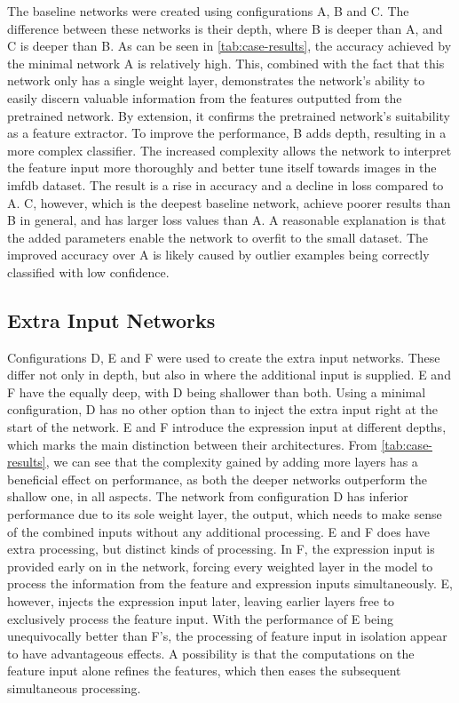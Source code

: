 The baseline networks were created using configurations A, B and C. The difference between these networks is their depth, where B is deeper than A, and C is deeper than B. As can be seen in \autoref{tab:case-results}, the accuracy achieved by the minimal network A is relatively high. This, combined with the fact that this network only has a single weight layer, demonstrates the network's ability to easily discern valuable information from the features outputted from the pretrained network. By extension, it confirms the pretrained network's suitability as a feature extractor. To improve the performance, B adds depth, resulting in a more complex classifier. The increased complexity allows the network to interpret the feature input more thoroughly and better tune itself towards images in the \acrshort{imfdb} dataset. The result is a rise in accuracy and a decline in loss compared to A. C, however, which is the deepest baseline network, achieve poorer results than B in general, and has larger loss values than A. A reasonable explanation is that the added parameters enable the network to overfit to the small dataset. The improved accuracy over A is likely caused by outlier examples being correctly classified with low confidence.

\subsection{Extra Input Networks}

Configurations D, E and F were used to create the extra input networks. These differ not only in depth, but also in where the additional input is supplied. E and F have the equally deep, with D being shallower than both. Using a minimal configuration, D has no other option than to inject the extra input right at the start of the network. E and F introduce the expression input at different depths, which marks the main distinction between their architectures. From \autoref{tab:case-results}, we can see that the complexity gained by adding more layers has a beneficial effect on performance, as both the deeper networks outperform the shallow one, in all aspects. The network from configuration D has inferior performance due to its sole weight layer, the output, which needs to make sense of the combined inputs without any additional processing. E and F does have extra processing, but distinct kinds of processing. In F, the expression input is provided early on in the network, forcing every weighted layer in the model to process the information from the feature and expression inputs simultaneously. E, however, injects the expression input later, leaving earlier layers free to exclusively process the feature input. With the performance of E being unequivocally better than F's, the processing of feature input in isolation appear to have advantageous effects. A possibility is that the computations on the feature input alone refines the features, which then eases the subsequent simultaneous processing. 

